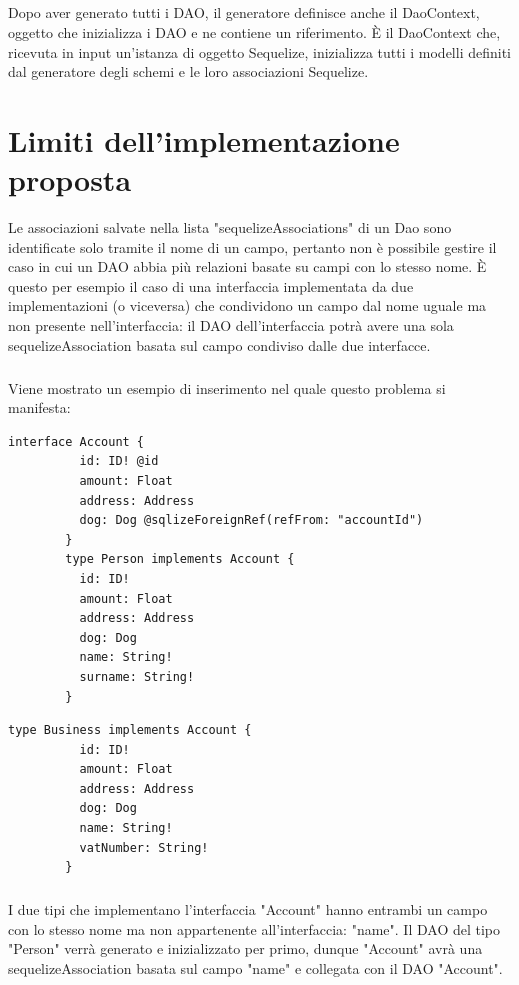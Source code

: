 \documentclass[a4paper, 12pt]{report}
\begin{document}
      \paragraph*{}
      Dopo aver generato tutti i DAO, il generatore definisce anche il DaoContext, oggetto che inizializza i DAO e ne contiene un riferimento.
      È il DaoContext che, ricevuta in input un'istanza di oggetto Sequelize, inizializza tutti i modelli definiti dal generatore degli schemi e le loro associazioni Sequelize. 
    \newpage
    \chapter{Limiti dell'implementazione proposta}
      Le associazioni salvate nella lista "sequelizeAssociations" di un Dao sono identificate solo tramite il nome di un campo, pertanto non è possibile gestire il caso in cui un DAO abbia più relazioni basate su campi con lo stesso nome.
      È questo per esempio il caso di una interfaccia implementata da due implementazioni (o viceversa) che condividono un campo dal nome uguale ma non presente nell'interfaccia: il DAO dell'interfaccia potrà avere una sola sequelizeAssociation basata sul campo condiviso dalle due interfacce.
      \paragraph*{}
      Viene mostrato un esempio di inserimento nel quale questo problema si manifesta:
      \begin{Verbatim}[samepage=true]
        interface Account {
          id: ID! @id
          amount: Float
          address: Address
          dog: Dog @sqlizeForeignRef(refFrom: "accountId")
        }
        type Person implements Account {
          id: ID!
          amount: Float
          address: Address
          dog: Dog
          name: String!
          surname: String!
        }
      \end{Verbatim}
      \begin{Verbatim}[samepage=true]
        type Business implements Account {
          id: ID!
          amount: Float
          address: Address
          dog: Dog
          name: String!
          vatNumber: String!
        }
      \end{Verbatim}
      \paragraph*{}
      I due tipi che implementano l'interfaccia "Account" hanno entrambi un campo con lo stesso nome ma non appartenente all'interfaccia: "name".
      Il DAO del tipo "Person" verrà generato e inizializzato per primo, dunque "Account" avrà una sequelizeAssociation basata sul campo "name" e collegata con il DAO "Account".
\end{document}

